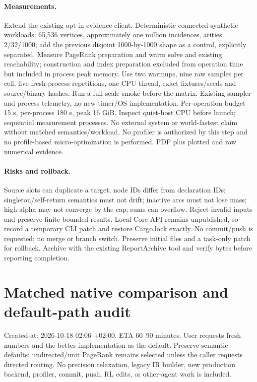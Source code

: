 \documentclass[11pt]{article}
\begin{document}
\paragraph{Measurements.} Extend the existing opt-in evidence client. Deterministic
connected synthetic workloads: 65,536 vertices, approximately one million
incidences, arities 2/32/1000; add the previous disjoint 1000-by-1000 shape as a
control, explicitly separated. Measure PageRank preparation and warm solve and
existing reachability; construction and index preparation excluded from operation
time but included in process peak memory. Use two warmups, nine raw samples per
cell, five fresh-process repetitions, one CPU thread, exact fixtures/seeds and
source/binary hashes. Run a full-scale smoke before the matrix. Existing sampler
and process telemetry, no new timer/OS implementation. Per-operation budget 15 s,
per-process 180 s, peak 16 GiB. Inspect quiet-host CPU before launch; sequential
measurement processes. No external system or world-fastest claim without matched
semantics/workload. No profiler is authorized by this step and no profile-based
micro-optimization is performed. PDF plus plotted and raw numerical evidence.

\paragraph{Risks and rollback.} Source slots can duplicate a target; node IDs differ
from declaration IDs; singleton/self-return semantics must not drift; inactive
arcs must not lose mass; high alpha may not converge by the cap; sums can overflow.
Reject invalid inputs and preserve finite bounded results. Local Core API remains
unpublished, so record a temporary CLI patch and restore Cargo.lock exactly.
No commit/push is requested; no merge or branch switch. Preserve initial files and
a task-only patch for rollback. Archive with the existing ReportArchive tool and
verify bytes before reporting completion.

\newpage\section*{Matched native comparison and default-path audit}
Created-at: 2026-10-18 02:06 +02:00. ETA 60--90 minutes. User requests fresh
numbers and the better implementation as the default. Preserve semantic defaults:
undirected/unit PageRank remains selected unless the caller requests directed
routing. No precision relaxation, legacy IR builder, new production backend,
profiler, commit, push, RL edits, or other-agent work is included.
\end{document}
